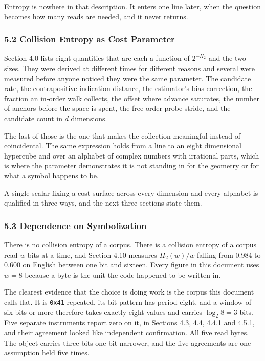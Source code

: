Entropy is nowhere in that description. It enters one line later, when the question becomes how many reads are needed, and it never returns.

\subsubsection{5.2 Collision Entropy as Cost Parameter}

Section 4.0 lists eight quantities that are each a function of \(2^{-H_2}\) and the two sizes. They were derived at different times for different reasons and several were measured before anyone noticed they were the same parameter. The candidate rate, the contrapositive indication distance, the estimator's bias correction, the fraction an in-order walk collects, the offset where advance saturates, the number of anchors before the space is spent, the free order probe stride, and the candidate count in \(d\) dimensions.

The last of those is the one that makes the collection meaningful instead of coincidental. The same expression holds from a line to an eight dimensional hypercube and over an alphabet of complex numbers with irrational parts, which is where the parameter demonstrates it is not standing in for the geometry or for what a symbol happens to be.

A single scalar fixing a cost surface across every dimension and every alphabet is qualified in three ways, and the next three sections state them.

\subsubsection{5.3 Dependence on Symbolization}

There is no collision entropy of a corpus. There is a collision entropy of a corpus read \(w\) bits at a time, and Section 4.10 measures \(H_2(w)/w\) falling from 0.984 to 0.600 on English between one bit and sixteen. Every figure in this document uses \(w = 8\) because a byte is the unit the code happened to be written in.

The clearest evidence that the choice is doing work is the corpus this document calls flat. It is \texttt{0x41} repeated, its bit pattern has period eight, and a window of six bits or more therefore takes exactly eight values and carries \(\log_2 8 = 3\) bits. Five separate instruments report zero on it, in Sections 4.3, 4.4, 4.4.1 and 4.5.1, and their agreement looked like independent confirmation. All five read bytes. The object carries three bits one bit narrower, and the five agreements are one assumption held five times.

